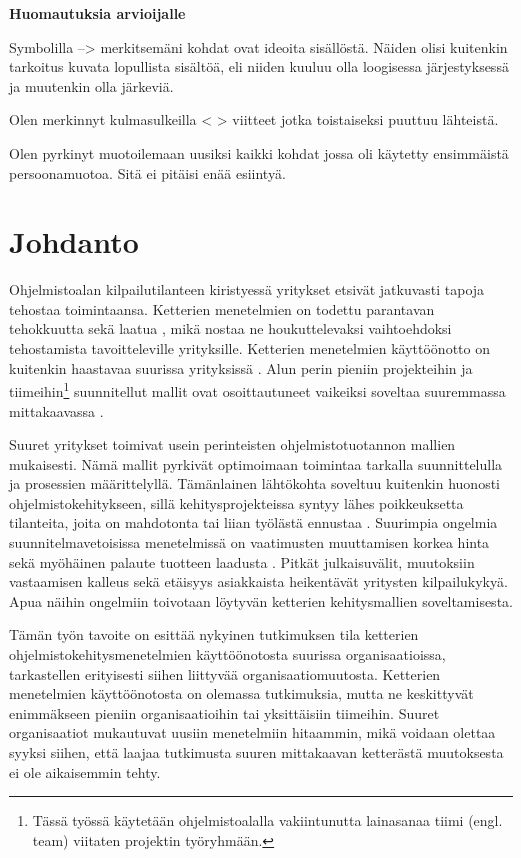 
\textbf{Huomautuksia arvioijalle}

Symbolilla --> merkitsemäni kohdat ovat ideoita sisällöstä. Näiden olisi
kuitenkin tarkoitus kuvata lopullista sisältöä, eli niiden kuuluu olla
loogisessa järjestyksessä ja muutenkin olla järkeviä.

Olen merkinnyt kulmasulkeilla < > viitteet jotka toistaiseksi puuttuu lähteistä.

Olen pyrkinyt muotoilemaan uusiksi kaikki kohdat jossa oli käytetty ensimmäistä
persoonamuotoa. Sitä ei pitäisi enää esiintyä.

\newpage

\section{Johdanto}

Ohjelmistoalan kilpailutilanteen kiristyessä yritykset etsivät jatkuvasti tapoja
tehostaa toimintaansa. Ketterien menetelmien on todettu parantavan tehokkuutta
sekä laatua , mikä nostaa ne houkuttelevaksi vaihtoehdoksi
tehostamista tavoitteleville yrityksille. Ketterien menetelmien käyttöönotto on
kuitenkin haastavaa suurissa yrityksissä . Alun perin pieniin
projekteihin ja tiimeihin\footnote{Tässä työssä käytetään ohjelmistoalalla
vakiintunutta lainasanaa tiimi (engl. team) viitaten projektin työryhmään.}
suunnitellut mallit ovat osoittautuneet vaikeiksi soveltaa suuremmassa
mittakaavassa .

Suuret yritykset toimivat usein perinteisten ohjelmistotuotannon mallien
mukaisesti. Nämä mallit pyrkivät optimoimaan toimintaa tarkalla suunnittelulla
ja prosessien määrittelyllä. Tämänlainen lähtökohta soveltuu kuitenkin huonosti
ohjelmistokehitykseen, sillä kehitysprojekteissa syntyy lähes poikkeuksetta
tilanteita, joita on mahdotonta tai liian työlästä ennustaa .
Suurimpia ongelmia suunnitelmavetoisissa menetelmissä on vaatimusten muuttamisen
korkea hinta sekä myöhäinen palaute tuotteen laadusta .
Pitkät julkaisuvälit, muutoksiin vastaamisen kalleus sekä etäisyys asiakkaista
heikentävät yritysten kilpailukykyä. Apua näihin ongelmiin toivotaan löytyvän
ketterien kehitysmallien soveltamisesta.

Tämän työn tavoite on esittää nykyinen tutkimuksen tila ketterien
ohjelmistokehitysmenetelmien käyttöönotosta suurissa organisaatioissa,
tarkastellen erityisesti siihen liittyvää organisaatiomuutosta. Ketterien
menetelmien käyttöönotosta on olemassa tutkimuksia, mutta ne keskittyvät
enimmäkseen pieniin organisaatioihin tai yksittäisiin tiimeihin. Suuret
organisaatiot mukautuvat uusiin menetelmiin hitaammin, mikä voidaan olettaa
syyksi siihen, että laajaa tutkimusta suuren mittakaavan ketterästä muutoksesta
ei ole aikaisemmin tehty.


